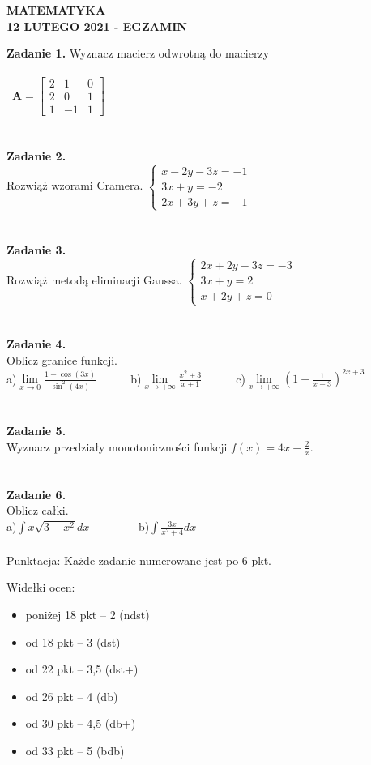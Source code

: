 \documentclass[12pt,a4paper]{report}
\begin{document}
\begin{center}

\textbf{MATEMATYKA \\12 LUTEGO 2021 - EGZAMIN}

\end{center}\textbf{Zadanie 1.} Wyznacz macierz odwrotną do macierzy \\\\\ $\mathbf{A} =\left[ \begin{array}{ccc}2 & 1& 0\\2& 0& 1\\1 & -1& 1\end{array} \right]$\\\\\\\textbf{Zadanie 2.}  \\Rozwiąż wzorami Cramera. $\left\{ \begin{array}{ll}x-2y-3z=-1\\ 3x+y=-2\\2x+3y+z=-1\end{array}\right.$\\\\\\\textbf{Zadanie 3.} \\Rozwiąż metodą eliminacji Gaussa. $\left\{ \begin{array}{ll}2x+2y-3z=-3\\3x+y=2\\x+2y+z=0\end{array} \right.$\\\\\\\textbf{Zadanie 4.} \\Oblicz granice funkcji.\\a)$\lim\limits_{x\to 0}\frac{1-\cos(3x)}{\sin^2(4x)}$\ \ \ \ \ \  b)$\lim\limits_{x\to +\infty}\frac{x^2+3}{x+1}$\ \ \ \ \ \ c)$\lim\limits_{x\to +\infty}\left( 1+\frac{1}{x-3}\right)^{2x+3}$\\\\\\\textbf{Zadanie 5.} \\Wyznacz przedziały monotoniczności funkcji $f(x)=4x-\frac{2}{x}$.\\\\\\\textbf{Zadanie 6.} \\Oblicz całki. \\a)$\int x\sqrt{3-x^2} dx$ \ \ \ \ \ \ \ \ b)$\int \frac{3x}{x^2+4} dx$\\\\Punktacja: Każde zadanie numerowane jest po 6 pkt.



Widełki ocen:

\begin{itemize}

\item poniżej 18 pkt -- 2 (ndst)

\item od 18 pkt -- 3 (dst)

\item od 22 pkt -- 3,5 (dst+)

\item od 26 pkt -- 4 (db)

\item od 30 pkt -- 4,5 (db+)

\item od 33 pkt -- 5 (bdb)

\end{itemize}
\end{document}
